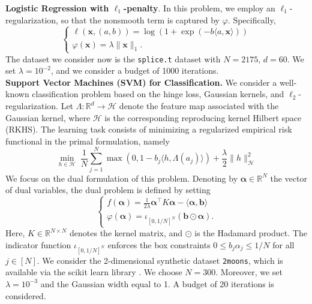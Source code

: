 \documentclass[11pt]{article}
\theoremstyle{plain}
\theoremstyle{definition}
\theoremstyle{remark}
\newcommand{\scalarp}[1]{\langle{#1}\rangle}
\newcommand{\R}{\mathbb{R}}
\newcommand{\m}{d}
\newcommand{\bx}{\bm{x}}
\newcommand{\reg}{\varphi}
\newcommand{\balpha}{\boldsymbol{\alpha}}
\begin{document}
\noindent
\textbf{Logistic Regression with $\ell_1$-penalty}.
In this problem, we employ an $\ell_1$-regularization, so that the nonsmooth term is captured by $\reg$. Specifically, 
\begin{equation*}
\begin{cases}
    \ell(\bx, (a, b)) = \log(1 + \exp(-b\scalarp{a,\bx})) \\
    \reg(\bx) = \lambda \lVert \bx \rVert_1.
\end{cases}  
\end{equation*}
The dataset we consider now is the \texttt{splice.t} dataset with $N = 2175$, $\m = 60$.
We set $\lambda = 10^{-2}$, and we consider a budget of 1000 iterations.\\

\noindent
\textbf{Support Vector Machines (SVM) for Classification.} We consider a well-known classification problem based on the hinge loss, Gaussian kernels, and $\ell_2$-regularization. Let $\Lambda: \R^\m \to \mathcal{H}$ denote the feature map associated with the Gaussian kernel, where $\mathcal{H}$ is the corresponding reproducing kernel Hilbert space (RKHS). The learning task consists of minimizing a regularized empirical risk functional in the primal formulation, namely
\begin{equation}
\min_{h\in \mathcal{H}} \;
\frac{1}{N} \sum_{j=1}^N \max\left(0, 1 -b_j\scalarp{h,\Lambda(a_j)}\right)  
+ \frac{\lambda}{2}\lVert h\rVert_\mathcal{H}^2
\end{equation}
We focus on the dual formulation of this problem. Denoting by $\balpha \in \mathbb{R}^N$ the vector of dual variables, the dual problem is defined by setting
\begin{equation*}
\begin{cases}
    f(\balpha) = \frac{1}{2\lambda}\balpha^\top K \balpha - \langle \balpha  , \mathbf{b} \rangle  \\
    \reg(\balpha) = \iota_{[0,1/N]^N}(\mathbf{b} \odot \balpha).
\end{cases}
\end{equation*}
Here, $K \in \R^{N \times N}$ denotes the kernel matrix, and $\odot$ is the Hadamard product. The indicator function $\iota_{[0,1/N]^N}$ enforces the box constraints $0 \le b_j\alpha_j \le 1/N$ for all $j \in [N]$.
We consider the 2-dimensional synthetic dataset \texttt{2moons}, which is available via the scikit learn library \cite{scikit}. We choose $N = 300$.
Moreover, we set $\lambda = 10^{-3}$ and the Gaussian width equal to 1. A budget of 20 iterations is considered.
\end{document}
